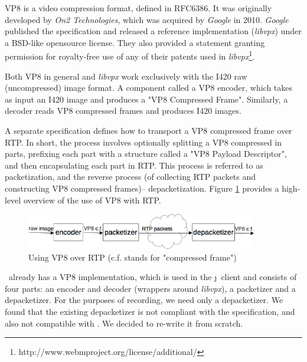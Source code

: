 \documentclass[twoside,openright,a4paper,12pt,english]{article}
\begin{document}
VP8 is a video compression format, defined in RFC6386\cite{vp8}. It was
originally developed by \emph{On2 Technologies}, which was acquired by
\emph{Google} in 2010. \emph{Google} published the specification and released a
reference implementation (\emph{libvpx}) under a BSD-like opensource
license. They also provided a statement granting permission for royalty-free
use of any of their patents used in
\emph{libvpx}\footnote{http://www.webmproject.org/license/additional/}.


Both VP8 in general and \emph{libvpx} work exclusively with the I420 raw
(uncompressed) image format\cite{i420}.
A component called a VP8 encoder, which takes as input an I420 image and produces a "VP8
Compressed Frame". Similarly, a decoder reads VP8 compressed frames and
produces I420 images.

A separate specification\cite{vp8rtp} defines how to transport a VP8 compressed
frame over RTP. In short, the process involves optionally splitting a VP8
compressed in parts, prefixing each part with a structure called a "VP8 Payload
Descriptor", and then encapsulating each part in RTP. This process is referred
to
as packetization, and the reverse process (of collecting RTP packets and
constructing VP8 compressed frames)-- depacketization. Figure \ref{vp8-scheme}
provides a high-level overview of the use of VP8 with RTP.

\begin{figure}[h]
    \includegraphics[width=0.9\textwidth]{./pics/vp8.eps}
    \caption{Using VP8 over RTP (c.f. stands for "compressed frame")}
    \label{vp8-scheme}
\end{figure}

\lj\ already has a VP8 implementation, which is used in the \j\ client and
consists of four parts: an encoder and decoder (wrappers around \emph{libvpx}),
a packetizer and a depacketizer. For the purposes of recording, we need 
only a depacketizer. We found that the existing depacketizer is not compliant with
the specification, and also not compatible with \wrtc. We decided to re-write it from scratch.
\end{document}
